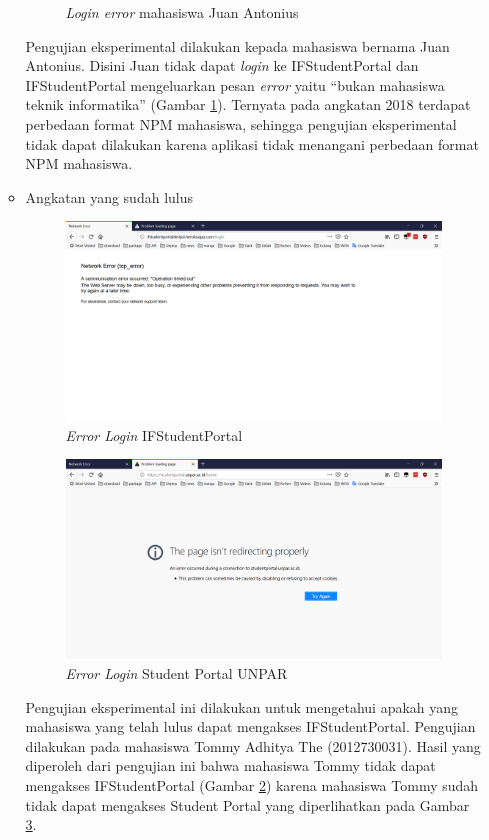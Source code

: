 \begin{itemize}
\begin{itemize}
\begin{figure}[H]
			\caption{\textit{Login error} mahasiswa Juan Antonius}
			\label{fig:2018_1_error}
		\end{figure}
		Pengujian eksperimental dilakukan kepada mahasiswa bernama Juan Antonius. Disini Juan tidak dapat \textit{login} ke IFStudentPortal dan IFStudentPortal mengeluarkan pesan \textit{error} yaitu ``bukan mahasiswa teknik informatika'' (Gambar \ref{fig:2018_1_error}). Ternyata pada angkatan 2018 terdapat perbedaan format NPM mahasiswa, sehingga pengujian eksperimental tidak dapat dilakukan karena aplikasi tidak menangani perbedaan format NPM mahasiswa.
		\item Angkatan yang sudah lulus \\
		\begin{figure}[H]
			\centering
			\includegraphics[scale=0.45]{Gambar/HasilPengujian/2012_1}
			\caption{\textit{Error Login} IFStudentPortal}
			\label{fig:2012_1}
		\end{figure}
		\begin{figure}[H]
			\centering
			\includegraphics[scale=0.45]{Gambar/HasilPengujian/2012_2}
			\caption{\textit{Error Login} Student Portal UNPAR}
			\label{fig:2012_2}
		\end{figure}
		Pengujian eksperimental ini dilakukan untuk mengetahui apakah yang mahasiswa yang telah lulus dapat mengakses IFStudentPortal. Pengujian dilakukan pada mahasiswa Tommy Adhitya The (2012730031). Hasil yang diperoleh dari pengujian ini bahwa mahasiswa Tommy tidak dapat mengakses IFStudentPortal (Gambar \ref{fig:2012_1}) karena mahasiswa Tommy sudah tidak dapat mengakses Student Portal yang diperlihatkan pada Gambar \ref{fig:2012_2}.
	\end{itemize}
\end{itemize}